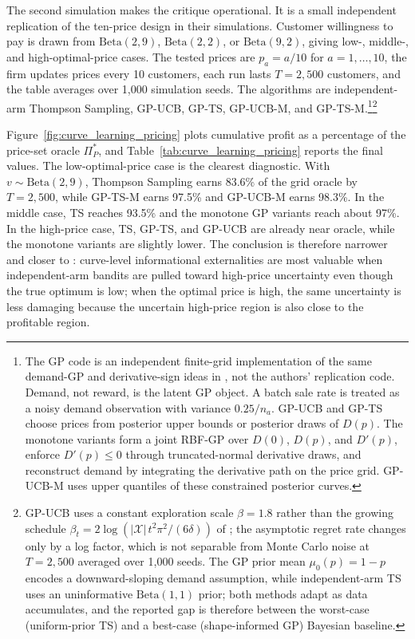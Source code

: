 The second simulation makes the \citet{Weaver2025} critique operational. It is a small independent replication of the ten-price design in their simulations. Customer willingness to pay is drawn from $\mathrm{Beta}(2,9)$, $\mathrm{Beta}(2,2)$, or $\mathrm{Beta}(9,2)$, giving low-, middle-, and high-optimal-price cases. The tested prices are $p_a=a/10$ for $a=1,\ldots,10$, the firm updates prices every 10 customers, each run lasts $T=2{,}500$ customers, and the table averages over 1{,}000 simulation seeds. The algorithms are independent-arm Thompson Sampling, GP-UCB, GP-TS, GP-UCB-M, and GP-TS-M.\footnote{The GP code is an independent finite-grid implementation of the same demand-GP and derivative-sign ideas in \citet{Weaver2025}, not the authors' replication code. Demand, not reward, is the latent GP object. A batch sale rate is treated as a noisy demand observation with variance $0.25/n_a$. GP-UCB and GP-TS choose prices from posterior upper bounds or posterior draws of $D(p)$. The monotone variants form a joint RBF-GP over $D(0)$, $D(p)$, and $D'(p)$, enforce $D'(p) \leq 0$ through truncated-normal derivative draws, and reconstruct demand by integrating the derivative path on the price grid. GP-UCB-M uses upper quantiles of these constrained posterior curves.}\footnote{GP-UCB uses a constant exploration scale $\beta = 1.8$ rather than the growing schedule $\beta_t = 2\log(|\mathcal{X}|\, t^2 \pi^2 / (6\delta))$ of \citet{Srinivas2010}; the asymptotic regret rate changes only by a log factor, which is not separable from Monte Carlo noise at $T = 2{,}500$ averaged over 1{,}000 seeds. The GP prior mean $\mu_0(p) = 1 - p$ encodes a downward-sloping demand assumption, while independent-arm TS uses an uninformative $\mathrm{Beta}(1,1)$ prior; both methods adapt as data accumulates, and the reported gap is therefore between the worst-case (uniform-prior TS) and a best-case (shape-informed GP) Bayesian baseline.}

Figure~\ref{fig:curve_learning_pricing} plots cumulative profit as a percentage of the price-set oracle $\Pi_P^*$, and Table~\ref{tab:curve_learning_pricing} reports the final values. The low-optimal-price case is the clearest diagnostic. With $v \sim \mathrm{Beta}(2,9)$, Thompson Sampling earns 83.6\% of the grid oracle by $T=2{,}500$, while GP-TS-M earns 97.5\% and GP-UCB-M earns 98.3\%. In the middle case, TS reaches 93.5\% and the monotone GP variants reach about 97\%. In the high-price case, TS, GP-TS, and GP-UCB are already near oracle, while the monotone variants are slightly lower. The conclusion is therefore narrower and closer to \citet{Weaver2025}: curve-level informational externalities are most valuable when independent-arm bandits are pulled toward high-price uncertainty even though the true optimum is low; when the optimal price is high, the same uncertainty is less damaging because the uncertain high-price region is also close to the profitable region.

